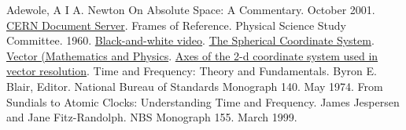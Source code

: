 \documentclass[12pt,a4paper]{book}
\newcounter{solution}[chapter] %
\begin{document}
\begin{thebibliography}{00}
     Adewole, A I A. Newton On Absolute Space: A Commentary. October 2001. \href{https://cds.cern.ch/record/523046}{CERN Document Server}.
     Frames of Reference. Physical Science Study Committee. 1960. \href{https://archive.org/details/FramesOfReference_201407}{Black-and-white video}.
     \href{https://en.wikipedia.org/wiki/Spherical_coordinate_system}{The Spherical Coordinate System}.
     \href{https://en.wikipedia.org/wiki/Vector_(mathematics_and_physics)}{Vector (Mathematics and Physics}.
      \href{https://www.physicsforums.com/threads/axes-of-the-2-d-coordinate-system-used-in-vector-resolution.1001481/}{Axes of the 2-d coordinate system used in vector resolution}.
     Time and Frequency: Theory and Fundamentals. Byron E. Blair, Editor. National Bureau of Standards Monograph 140. May 1974.
     From Sundials to Atomic Clocks: Understanding Time and Frequency. James Jespersen and Jane Fitz-Randolph. NBS Monograph 155. March 1999.
\end{thebibliography}
\end{document}
